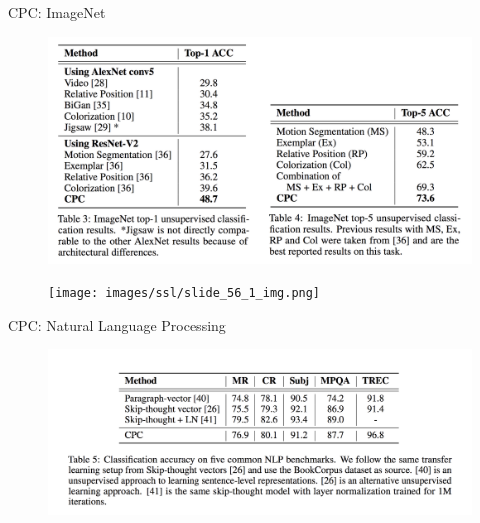 \begin{frame}[allowframebreaks]{CPC: ImageNet}
    \framebreak

    \begin{figure}
        \centering
        \includegraphics[width=1\linewidth,height=0.9\textheight,keepaspectratio]{images/ssl/slide_55_1_img.png}
    \end{figure}

    \framebreak

    \begin{figure}
        \centering
        \texttt{[image: images/ssl/slide\_56\_1\_img.png]}
    \end{figure}
\end{frame}


\begin{frame}[allowframebreaks]{CPC: Natural Language Processing}
    \begin{figure}
        \centering
        \includegraphics[width=1\linewidth,height=0.9\textheight,keepaspectratio]{images/ssl/slide_57_1_img.png}
    \end{figure}
\end{frame}


